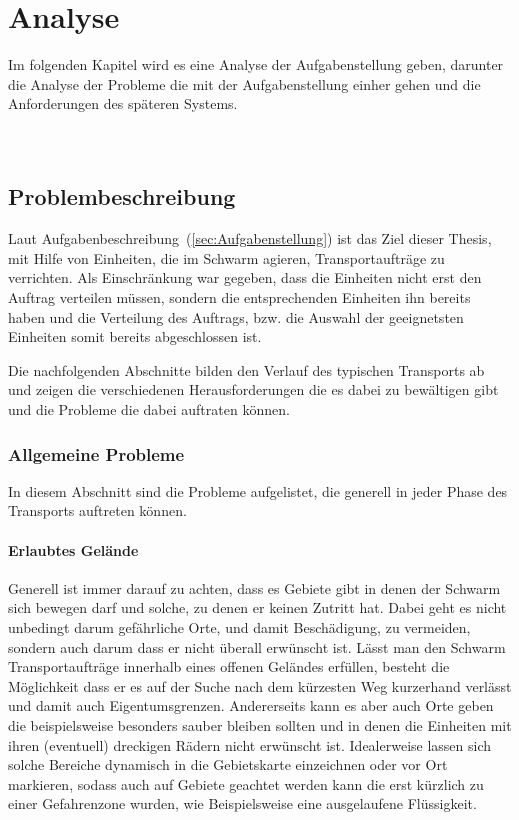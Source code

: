 \chapter{Analyse}\label{ch:Analyse}
Im folgenden Kapitel wird es eine Analyse der Aufgabenstellung geben, darunter die Analyse der Probleme die mit der Aufgabenstellung einher gehen und die Anforderungen des späteren Systems.\\

\\

\\
\section{Problembeschreibung}\label{sec:Problembeschreibung}
Laut Aufgabenbeschreibung~(\autoref{sec:Aufgabenstellung}) ist das Ziel dieser Thesis, mit Hilfe von Einheiten, die im Schwarm agieren, Transportaufträge zu verrichten.
Als Einschränkung war gegeben, dass die Einheiten nicht erst den Auftrag verteilen müssen, sondern die entsprechenden Einheiten ihn bereits haben und die Verteilung des Auftrags, bzw. die Auswahl der geeignetsten Einheiten somit bereits abgeschlossen ist.

Die nachfolgenden Abschnitte bilden den Verlauf des typischen Transports ab und zeigen die verschiedenen Herausforderungen die es dabei zu bewältigen gibt und die Probleme die dabei auftraten können.

\subsection*{Allgemeine Probleme}\label{subsec:AllgemeineProbleme}
In diesem Abschnitt sind die Probleme aufgelistet, die generell in jeder Phase des Transports auftreten können.

\subsubsection*{Erlaubtes Gelände}
Generell ist immer darauf zu achten, dass es Gebiete gibt in denen der Schwarm sich bewegen darf und solche, zu denen er keinen Zutritt hat.
Dabei geht es nicht unbedingt darum gefährliche Orte, und damit Beschädigung, zu vermeiden, sondern auch darum dass er nicht überall erwünscht ist.
Lässt man den Schwarm Transportaufträge innerhalb eines offenen Geländes erfüllen, besteht die Möglichkeit dass er es auf der Suche nach dem kürzesten Weg kurzerhand verlässt und damit auch Eigentumsgrenzen.
Andererseits kann es aber auch Orte geben die beispielsweise besonders sauber bleiben sollten und in denen die Einheiten mit ihren (eventuell) dreckigen Rädern nicht erwünscht ist.
Idealerweise lassen sich solche Bereiche dynamisch in die Gebietskarte einzeichnen oder vor Ort markieren, sodass auch auf Gebiete geachtet werden kann die erst kürzlich zu einer Gefahrenzone wurden, wie Beispielsweise eine ausgelaufene Flüssigkeit.

